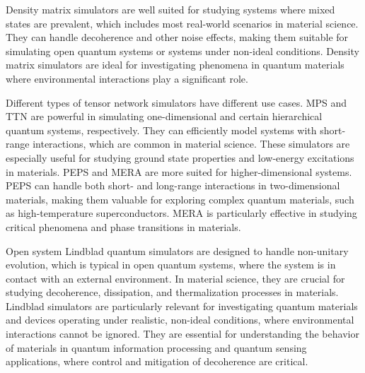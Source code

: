 Density matrix simulators are well suited for studying systems where mixed states are prevalent, which includes most real-world scenarios in material science. They can handle decoherence and other noise effects, making them suitable for simulating open quantum systems or systems under non-ideal conditions. Density matrix simulators are ideal for investigating phenomena in quantum materials where environmental interactions play a significant role.

Different types of tensor network simulators have different use cases.
MPS and TTN are powerful in simulating one-dimensional and certain hierarchical quantum systems, respectively. They can efficiently model systems with short-range interactions, which are common in material science. These simulators are especially useful for studying ground state properties and low-energy excitations in materials.
PEPS and MERA are more suited for higher-dimensional systems. PEPS can handle both short- and long-range interactions in two-dimensional materials, making them valuable for exploring complex quantum materials, such as high-temperature superconductors. MERA is particularly effective in studying critical phenomena and phase transitions in materials.

Open system Lindblad quantum simulators are designed to handle non-unitary evolution, which is typical in open quantum systems, where the system is in contact with an external environment. In material science, they are crucial for studying decoherence, dissipation, and thermalization processes in materials. Lindblad simulators are particularly relevant for investigating quantum materials and devices operating under realistic, non-ideal conditions, where environmental interactions cannot be ignored. They are essential for understanding the behavior of materials in quantum information processing and quantum sensing applications, where control and mitigation of decoherence are critical.

